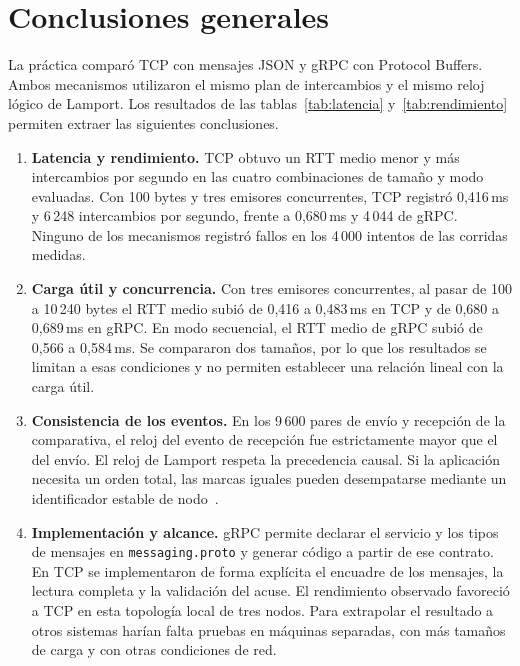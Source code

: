 \section{Conclusiones generales}

La práctica comparó TCP con mensajes JSON y gRPC con Protocol Buffers. Ambos mecanismos utilizaron el mismo plan de intercambios y el mismo reloj lógico de Lamport. Los resultados de las tablas~\ref{tab:latencia} y~\ref{tab:rendimiento} permiten extraer las siguientes conclusiones.

\begin{enumerate}
\item \textbf{Latencia y rendimiento.} TCP obtuvo un RTT medio menor y más intercambios por segundo en las cuatro combinaciones de tamaño y modo evaluadas. Con 100 bytes y tres emisores concurrentes, TCP registró 0,416\,ms y 6\,248 intercambios por segundo, frente a 0,680\,ms y 4\,044 de gRPC. Ninguno de los mecanismos registró fallos en los 4\,000 intentos de las corridas medidas.

\item \textbf{Carga útil y concurrencia.} Con tres emisores concurrentes, al pasar de 100 a 10\,240 bytes el RTT medio subió de 0,416 a 0,483\,ms en TCP y de 0,680 a 0,689\,ms en gRPC. En modo secuencial, el RTT medio de gRPC subió de 0,566 a 0,584\,ms. Se compararon dos tamaños, por lo que los resultados se limitan a esas condiciones y no permiten establecer una relación lineal con la carga útil.

\item \textbf{Consistencia de los eventos.} En los 9\,600 pares de envío y recepción de la comparativa, el reloj del evento de recepción fue estrictamente mayor que el del envío. El reloj de Lamport respeta la precedencia causal. Si la aplicación necesita un orden total, las marcas iguales pueden desempatarse mediante un identificador estable de nodo~\cite{emanuel_lamport1978}.

\item \textbf{Implementación y alcance.} gRPC permite declarar el servicio y los tipos de mensajes en \texttt{messaging.proto} y generar código a partir de ese contrato. En TCP se implementaron de forma explícita el encuadre de los mensajes, la lectura completa y la validación del acuse. El rendimiento observado favoreció a TCP en esta topología local de tres nodos. Para extrapolar el resultado a otros sistemas harían falta pruebas en máquinas separadas, con más tamaños de carga y con otras condiciones de red.
\end{enumerate}
